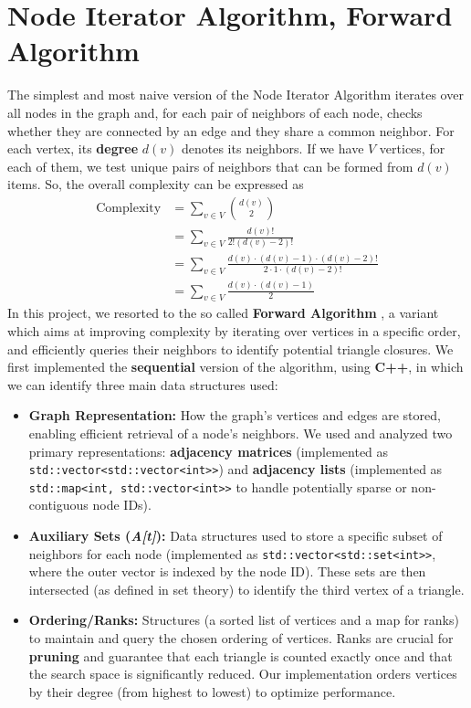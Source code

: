 \documentclass{aes2e}
\begin{document}
\section{Node Iterator Algorithm, Forward Algorithm}
The simplest and most naive version of the Node Iterator Algorithm iterates over all nodes in the graph and, for each pair of neighbors of each node, checks whether they are connected by an edge and they share a common neighbor. For each vertex, its \textbf{degree} $d(v)$ denotes its neighbors. If we have $V$ vertices, for each of them, we test unique pairs of neighbors that can be formed from $d(v)$ items. So, the overall complexity can be expressed as
\begin{align*}
\text{Complexity} &= \sum_{v \in V} \binom{d(v)}{2} \\
&= \sum_{v \in V} \frac{d(v)!}{2!(d(v)-2)!} \\
&= \sum_{v \in V} \frac{d(v) \cdot (d(v)-1) \cdot (d(v)-2)!}{2 \cdot 1 \cdot (d(v)-2)!} \\
&= \sum_{v \in V} \frac{d(v) \cdot (d(v)-1)}{2}
\end{align*}
In this project, we resorted to the so called \textbf{Forward Algorithm} \cite{DEK2}, a variant which aims at improving complexity by iterating over vertices in a specific order, and efficiently queries their neighbors to identify potential triangle closures. We first implemented the \textbf{sequential} version of the algorithm, using \textbf{C++}, in which we can identify three main data structures used:
\begin{itemize}
    \item \textbf{Graph Representation:} How the graph's vertices and edges are stored, enabling efficient retrieval of a node's neighbors. We used and analyzed two primary representations: \textbf{adjacency matrices} (implemented as \texttt{std::vector<std::vector<int>>}) and \textbf{adjacency lists} (implemented as \texttt{std::map<int, std::vector<int>>} to handle potentially sparse or non-contiguous node IDs).
    \item \textbf{Auxiliary Sets (\textit{A[t]}):} Data structures used to store a specific subset of neighbors for each node (implemented as \texttt{std::vector<std::set<int>>}, where the outer vector is indexed by the node ID). These sets are then intersected (as defined in set theory) to identify the third vertex of a triangle.
    \item \textbf{Ordering/Ranks:} Structures (a sorted list of vertices and a map for ranks) to maintain and query the chosen ordering of vertices. Ranks are crucial for \textbf{pruning} and guarantee that each triangle is counted exactly once and that the search space is significantly reduced. Our implementation orders vertices by their degree (from highest to lowest) to optimize performance.
\end{itemize}
\end{document}
